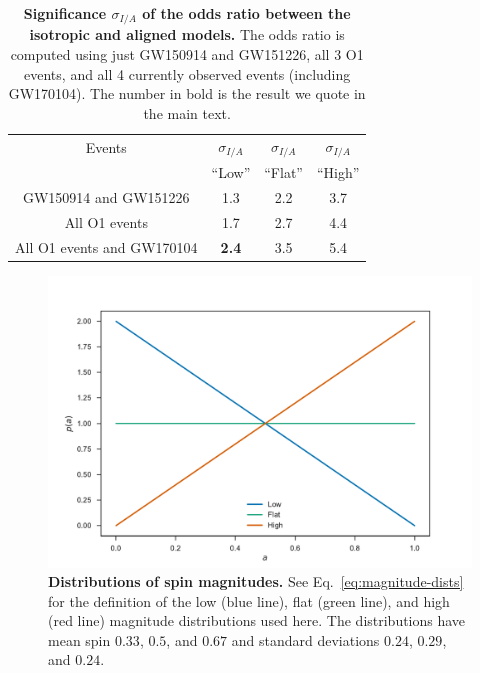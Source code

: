 \documentclass{nature-arxiv}
\begin{document}
\begin{methods}
\begin{thebibliography}{10}
\end{thebibliography}

\newpage

\begin{table}
\begin{centering}
\begin{tabular}{ c |  c  |  c  | c  }
  \hline 
  \hline
Events & $\sigma_{I/A}$ &  $\sigma_{I/A}$ & $\sigma_{I/A}$ \\ 
 & ``Low'' & ``Flat'' & ``High'' \\ \hline
GW150914 and GW151226 &  1.3 & 2.2 & 3.7 \\ %
All O1 events & 1.7 & 2.7 & 4.4 \\ %
All O1 events and GW170104 & \textbf{2.4} & 3.5 & 5.4 \\ \hline
\end{tabular}
\caption[]{\textbf{Significance $\sigma_{I/A}$ of the odds ratio between the isotropic and aligned models.} The odds ratio is computed using just GW150914 and GW151226, all 3 O1 events, and all 4 currently observed events (including GW170104). The number in bold is the result we quote in the main text.}
\label{tab:accumulation}
\end{centering}
\end{table}

\newpage

\begin{figure}
  \includegraphics[width=\columnwidth]{../plots/pa}
  \caption{\textbf{Distributions of spin magnitudes.}  See Eq.\
    \eqref{eq:magnitude-dists} for the definition of the low (blue
    line), flat (green line), and high (red line) magnitude
    distributions used here.  The distributions have mean spin $0.33$,
    $0.5$, and $0.67$ and standard deviations $0.24$, $0.29$, and
    $0.24$.}
  \label{fig:pa}
\end{figure}


\end{methods}
\end{document}
